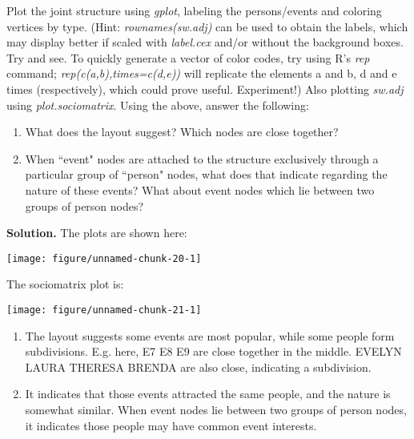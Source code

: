 \documentclass[11pt, oneside]{article}\usepackage[]{graphicx}\usepackage[]{color}
\makeatletter
\def\maxwidth{ %
  \ifdim\Gin@nat@width>\linewidth
    \linewidth
  \else
    \Gin@nat@width
  \fi
}
\newenvironment{knitrout}{}{} %
\newenvironment{solution}{\begin{trivlist} \item \textbf{Solution.}}{\end{trivlist}}
\newenvironment{prob}[2][Problem]{\begin{trivlist}
\item[\hskip \labelsep {\bfseries #1}\hskip \labelsep {\bfseries #2.}]}{\end{trivlist}}
\makeatother
\begin{document}
\begin{prob}{2}
\begin{enumerate}
\noindent
Plot the joint structure using \emph{gplot}, labeling the persons/events and coloring vertices by type. (Hint: \emph{rownames(sw.adj)} can be used to obtain the labels, which may display better if scaled with \emph{label.cex} and/or without the background boxes. Try and see. To quickly generate a vector of color codes, try using R's \emph{rep} command; \emph{rep(c(a,b),times=c(d,e))} will replicate the elements a and b, d and e times (respectively), which could prove useful. Experiment!) Also plotting \emph{sw.adj} using \emph{plot.sociomatrix}. Using the above, answer the following:
\begin{enumerate}
\item What does the layout suggest? Which nodes are close together?
\item When ``event" nodes are attached to the structure exclusively  through a particular group of ``person" nodes, what does that indicate regarding the nature of these events? What about event nodes which lie between two groups of person nodes?
\end{enumerate}

\begin{solution}
The plots are shown here:
\begin{center}
\begin{knitrout}
\color{fgcolor}

{\centering \texttt{[image: figure/unnamed-chunk-20-1]} 

}



\end{knitrout}
\end{center}
The sociomatrix plot is:
\begin{center}
\begin{knitrout}
\color{fgcolor}

{\centering \texttt{[image: figure/unnamed-chunk-21-1]} 

}



\end{knitrout}
\end{center}

  \begin{enumerate}
  \item The layout suggests some events are most popular, while some people form 
subdivisions. E.g. here, E7 E8 E9 are close together in the middle. EVELYN LAURA THERESA 
BRENDA are also close, indicating a subdivision.
  \item It indicates that those events attracted the same people, and the nature is 
somewhat similar. When event nodes lie between two groups of person nodes, it indicates 
those people may have common event interests.
  \end{enumerate}
\end{solution}



\end{enumerate}
\end{prob}
\end{document}
